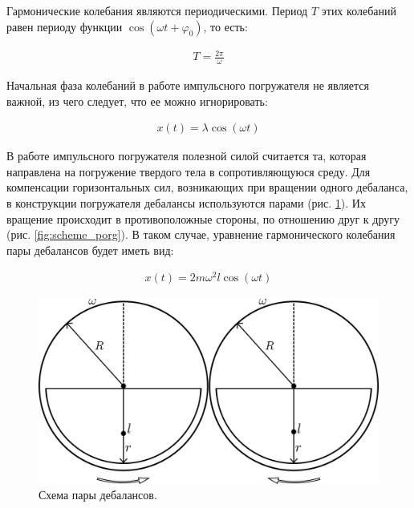 Гармонические колебания являются периодическими. Период $T$ этих колебаний равен периоду функции $\cos (\omega t + \varphi_0)$, то есть:

\begin{equation*}
    \begin{aligned}
        T = \frac{2 \pi}{\omega}
    \end{aligned}
\end{equation*}

Начальная фаза колебаний в работе импульсного погружателя не является важной, из чего следует, что ее можно игнорировать:

\begin{equation}\label{eq:harmonic_notphi}
    \begin{aligned}
        x(t) = \lambda \cos (\omega t)
    \end{aligned}
\end{equation}

В работе импульсного погружателя полезной силой считается та, которая направлена на погружение твердого тела в сопротивляющуюся среду.
Для компенсации горизонтальных сил, возникающих при вращении одного дебаланса,
в конструкции погружателя дебалансы используются парами (рис. \ref{fig:double_debalance}).
Их вращение происходит в противоположные стороны, по отношению друг к другу (рис. \ref{fig:scheme_porg}).
В таком случае, уравнение гармонического колебания пары дебалансов будет иметь вид:

\begin{equation}\label{eq:harmonic_dual}
    \begin{aligned}
        x(t) = 2 m \omega^2 l \cos (\omega t)
    \end{aligned}
\end{equation}

\begin{figure}[h]
    \centering
    \includegraphics[width=0.8\linewidth]{img/double_debalance.png}
    \caption{Схема пары дебалансов.}
    \label{fig:double_debalance}
\end{figure}

